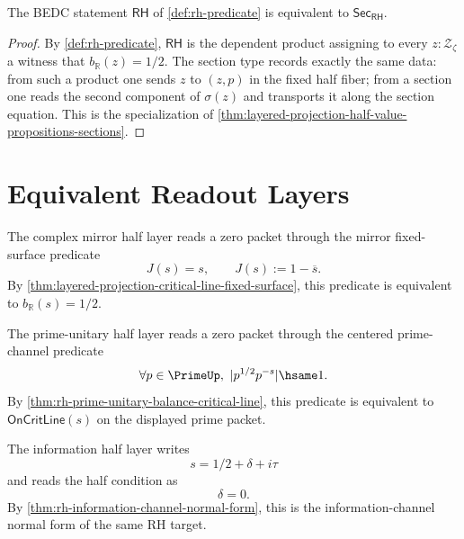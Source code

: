 \begin{proposition}
\label{prop:rh-layered-rh-fixed-half-section}
The BEDC statement $\mathsf{RH}$ of \autoref{def:rh-predicate} is
equivalent to $\mathsf{Sec}_{\mathsf{RH}}$.
\end{proposition}

\begin{proof}
By \autoref{def:rh-predicate}, $\mathsf{RH}$ is the dependent product
assigning to every $z:\mathcal Z_{\zeta}$ a witness that
$b_{\mathbb R}(z)=1/2$. The section type records exactly the same data:
from such a product one sends $z$ to $(z,p)$ in the fixed half fiber; from
a section one reads the second component of $\sigma(z)$ and transports it
along the section equation. This is the specialization of
\autoref{thm:layered-projection-half-value-propositions-sections}.
\end{proof}

\section{Equivalent Readout Layers}
\label{sec:rh-layered-equivalent-readout-layers}

\begin{definition}
\label{def:rh-layered-complex-mirror-half-layer}
The complex mirror half layer reads a zero packet through the mirror
fixed-surface predicate
$$
J(s)=s,
\qquad
J(s):=1-\overline{s}.
$$
By \autoref{thm:layered-projection-critical-line-fixed-surface}, this
predicate is equivalent to $b_{\mathbb R}(s)=1/2$.
\end{definition}

\begin{definition}
\label{def:rh-layered-prime-unitary-half-layer}
The prime-unitary half layer reads a zero packet through the centered
prime-channel predicate
$$
\forall p\in\PrimeUp,\ |p^{1/2}p^{-s}|\hsame 1.
$$
By \autoref{thm:rh-prime-unitary-balance-critical-line}, this predicate is
equivalent to $\mathsf{OnCritLine}(s)$ on the displayed prime packet.
\end{definition}

\begin{definition}
\label{def:rh-layered-information-half-layer}
The information half layer writes
$$
s=1/2+\delta+i\tau
$$
and reads the half condition as
$$
\delta=0.
$$
By \autoref{thm:rh-information-channel-normal-form}, this is the
information-channel normal form of the same RH target.
\end{definition}

